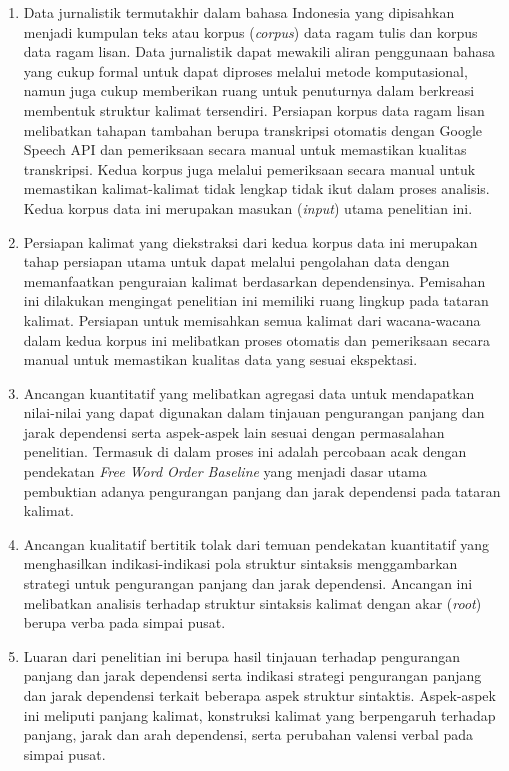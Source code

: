 \begin{enumerate}
	\item Data jurnalistik termutakhir dalam bahasa Indonesia yang dipisahkan menjadi kumpulan teks atau korpus (\textit{corpus}) data ragam tulis dan korpus data ragam lisan. Data jurnalistik dapat mewakili aliran penggunaan bahasa yang cukup formal untuk dapat diproses melalui metode komputasional, namun juga cukup memberikan ruang untuk penuturnya dalam berkreasi membentuk struktur kalimat tersendiri. Persiapan korpus data ragam lisan melibatkan tahapan tambahan berupa transkripsi otomatis dengan Google Speech API dan pemeriksaan secara manual untuk memastikan kualitas transkripsi. Kedua korpus juga melalui pemeriksaan secara manual untuk memastikan kalimat-kalimat tidak lengkap tidak ikut dalam proses analisis. Kedua korpus data ini merupakan masukan (\textit{input}) utama penelitian ini.
	\item Persiapan kalimat yang diekstraksi dari kedua korpus data ini merupakan tahap persiapan utama untuk dapat melalui pengolahan data dengan memanfaatkan penguraian kalimat berdasarkan dependensinya. Pemisahan ini dilakukan mengingat penelitian ini memiliki ruang lingkup pada tataran kalimat. Persiapan untuk memisahkan semua kalimat dari wacana-wacana dalam kedua korpus ini melibatkan proses otomatis dan pemeriksaan secara manual untuk memastikan kualitas data yang sesuai ekspektasi. 
	\item Ancangan kuantitatif yang melibatkan agregasi data untuk mendapatkan nilai-nilai yang dapat digunakan dalam tinjauan pengurangan panjang dan jarak dependensi serta aspek-aspek lain sesuai dengan permasalahan penelitian. Termasuk di dalam proses ini adalah percobaan acak dengan pendekatan \textit{Free Word Order Baseline} yang menjadi dasar utama pembuktian adanya pengurangan panjang dan jarak dependensi pada tataran kalimat.
	\item Ancangan kualitatif bertitik tolak dari temuan pendekatan kuantitatif yang menghasilkan indikasi-indikasi pola struktur sintaksis menggambarkan strategi untuk pengurangan panjang dan jarak dependensi. Ancangan ini melibatkan analisis terhadap struktur sintaksis kalimat dengan akar (\textit{root}) berupa verba pada simpai pusat. 
	\item Luaran dari penelitian ini berupa hasil tinjauan terhadap pengurangan panjang dan jarak dependensi serta indikasi strategi pengurangan panjang dan jarak dependensi terkait beberapa aspek struktur sintaktis. Aspek-aspek ini meliputi panjang kalimat, konstruksi kalimat yang berpengaruh terhadap panjang, jarak dan arah dependensi, serta perubahan valensi verbal pada simpai pusat.
\end{enumerate}

